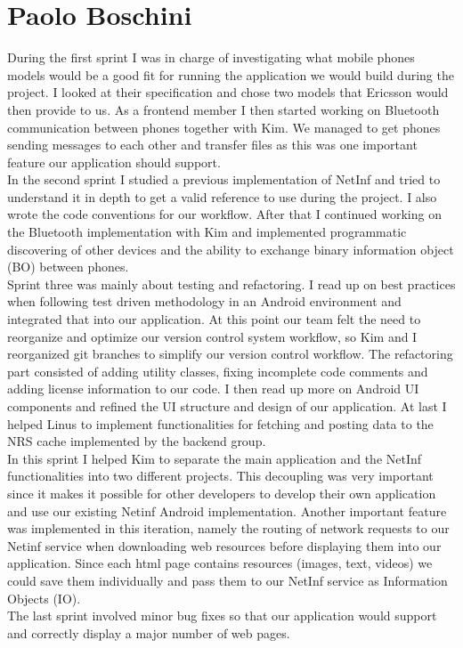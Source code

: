 \section{Paolo Boschini}

During the first sprint I was in charge of investigating what mobile phones models
would be a good fit for running the application we would build during the project.
I looked at their specification and chose two models that Ericsson would then provide to us.
As a frontend member I then started working on Bluetooth communication between phones
together with Kim. We managed to get phones sending messages to each other and transfer
files as this was one important feature our application should support.\\

In the second sprint I studied a previous implementation of NetInf and tried to understand
it in depth to get a valid reference to use during the project. 
I also wrote the code conventions for our workflow. After that I continued working on the Bluetooth implementation
with Kim and implemented programmatic discovering of other devices and the ability to
exchange binary information object (BO) between phones.\\

Sprint three was mainly about testing and refactoring. I read up on best practices when following 
test driven methodology in an Android environment and integrated that into our application.
At this point our team felt the need to reorganize and optimize our version control system workflow,
so Kim and I reorganized git branches to simplify our version control workflow.
The refactoring part consisted of adding utility classes, fixing incomplete code comments and adding license
information to our code. I then read up more on Android UI components and refined the UI structure and design of our application.
At last I helped Linus to implement functionalities for fetching and posting data to the NRS cache implemented by the backend group.\\

In this sprint I helped Kim to separate the main application and the NetInf functionalities into two different projects.
This decoupling was very important since it makes it possible for other developers to develop their own application
and use our existing Netinf Android implementation.
Another important feature was implemented in this iteration, namely the routing of network requests to our Netinf service
when downloading web resources before displaying them into our application. Since each html page contains resources (images, text, videos) we could
save them individually and pass them to our NetInf service as Information Objects (IO).\\

The last sprint involved minor bug fixes so that our application would support and correctly display a major number of web pages.\\
